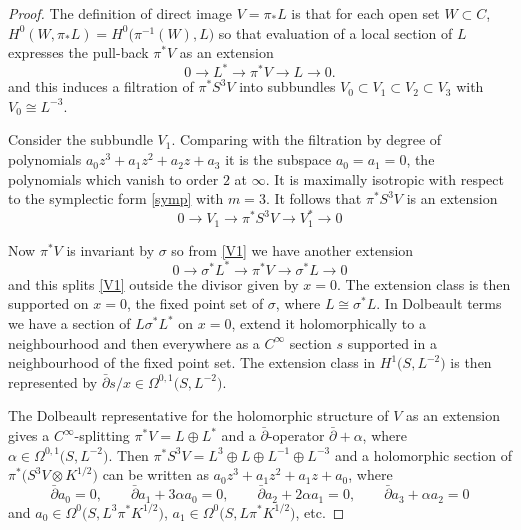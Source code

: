 \begin{proof} The definition of direct image $V=\pi_*L$ is that for each open set $W\subset C$, $H^0(W, \pi_*L)=H^0\big(\pi^{-1}(W), L\big)$ so that evaluation of a local section of $L$ expresses the pull-back $\pi^*V$ as an extension{\samepage
\begin{equation}
0\rightarrow L^*\rightarrow \pi^*V\rightarrow L\rightarrow 0.
\label{V1}
\end{equation}
and this induces a filtration of $\pi^*S^3V$ into subbundles $V_0\subset V_1\subset V_2\subset V_3$ with $V_0\cong L^{-3}$.}

Consider the subbundle $V_1$. Comparing with the filtration by degree of polynomials $a_0z^3+a_1z^{2}+a_2z+a_3$ it is the subspace $a_0=a_{1}=0$, the polynomials which vanish to order $2$ at $\infty$. It is maximally isotropic with respect to the symplectic form \eqref{symp} with $m=3$.
It follows that $\pi^*S^3V$ is an extension
\begin{equation}
0\rightarrow V_1\rightarrow \pi^*S^3V\rightarrow V_1^*\rightarrow 0
\label{ext}
\end{equation}

Now $\pi^*V$ is invariant by $\sigma$ so from \eqref{V1} we have another extension
\begin{displaymath}0\rightarrow \sigma^*L^*\rightarrow \pi^*V\rightarrow \sigma^*L\rightarrow 0\end{displaymath}
and this splits \eqref{V1} outside the divisor given by $x=0$. The extension class is then supported on $x=0$, the fixed point set of $\sigma$, where $L\cong \sigma^*L$. In Dolbeault terms
we have a section of $L\sigma^*L^*$ on $x=0$, extend it holomorphically to a neighbourhood and then everywhere as a $C^{\infty}$ section $s$ supported in a neighbourhood of the fixed point set. The extension class in $H^1\big(S,L^{-2}\big)$ is then represented by $\bar\partial s/x\in \Omega^{0,1}\big(S, L^{-2}\big)$.

The Dolbeault representative for the holomorphic structure of $V$ as an extension gives a $C^{\infty}$-splitting $\pi^*V=L\oplus L^*$ and a $\bar\partial $-operator $\bar\partial +\alpha$, where $\alpha\in \Omega^{0,1}\big(S, L^{-2}\big)$. Then $\pi^*S^3V=L^{3}\oplus L\oplus L^{-1}\oplus L^{-3}$ and a holomorphic section of $\pi^*\big(S^3V\otimes K^{1/2}\big)$ can be written as $a_0z^3+a_1z^{2}+a_1z+a_0$, where
\begin{displaymath}\bar\partial a_0=0,\qquad \bar\partial a_1+3\alpha a_0=0,\qquad \bar\partial a_2+2\alpha a_1=0, \qquad \bar\partial a_3+\alpha a_2=0\end{displaymath}
and $a_0\in \Omega^0\big(S, L^3\pi^*K^{1/2}\big)$, $a_1\in \Omega^0\big(S, L\pi^*K^{1/2}\big)$, etc.


\end{proof}
